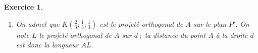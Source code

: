 \documentclass[10pt]{article}
\newtheorem{exo}{Exercice}
\begin{document}
\begin{exo}
\begin{enumerate}
\[\begin{cases}x&=x_A+t\times 1\\y&=y_A+t\times 2\\z&=z_A+t\times (-1)\end{cases}\hspace{1cm}\text{soit}\hspace{1cm}\begin{cases}x&=t\\y&=1+2t\\z&=1-t\end{cases}.\]

\medskip

On \og injecte \fg~{} ensuite cette représentation dans l'équation de $P$ et on résout~:

\begin{align*}
x+2y-z+1&=0\\
t+2(1+2t)-(1-t)+1&=0\\
t+2+4t-1+t+1&=0\\
6t+2&=0\\
t=-\frac{2}{6}&=-\frac{1}{3}.
\end{align*}

Enfin on remplace $t$ par $-\frac{1}{3}$ dans la représentation paramétrique~:
\[\begin{cases}x&=-\frac{1}{3}\\y&=1+2t=1+2\times \left(-\frac{1}{3}\right)=1-\frac{2}{3}=\frac{1}{3}\\z&=1-t=1-\left( -\frac{1}{3}\right)=\frac{3}{3}+\frac{1}{3}=\frac{4}{3}\end{cases}.\]

Conclusion~: $H\left(-\frac{1}{3};\frac{1}{3};\frac{4}{3}\right)$.

\item On admet que $K\left(\frac{2}{3};\frac{1}{3};\frac{1}{3}\right)$ est le projeté orthogonal de $A$ sur le plan $P'.$ On note $L$ le projeté orthogonal de $A$ sur $d~;$ la distance du point $A$ à la droite $d$ est donc la longueur $AL.$

\medskip



\end{enumerate}
\end{exo}
\end{document}
